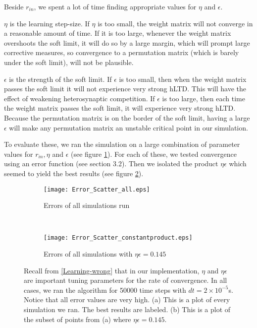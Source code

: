 Beside \(r_{in}\), we spent a lot of time finding appropriate values for \(\eta\) and \(\epsilon\). 

\(\eta\) is the learning step-size. If \(\eta\) is too small, the weight matrix will not converge in a reasonable amount of time. If it is too large, whenever the weight matrix overshoots the soft limit, it will do so by a large margin, which will prompt large corrective measures, so convergence to a permutation matrix (which is barely under the soft limit), will not be plausible.
 
\(\epsilon\) is the strength of the soft limit. If \(\epsilon\) is too small, then when the weight matrix passes the soft limit it will not experience very strong hLTD. This will have the effect of weakening heterosynaptic competition. If \(\epsilon\) is too large, then each time the weight matrix passes the soft limit, it will experience very strong hLTD. Because the permutation matrix is on the border of the soft limit, having a large \(\epsilon\) will make any permutation matrix an unstable critical point in our simulation.

To evaluate these, we ran the simulation on a large combination of parameter values for \(r_{in}, \eta\) and \(\epsilon\) (see figure \ref{Error_scatter: all}). For each of these, we tested convergence using an error function (see section 3.2). Then we isolated the product \(\eta\epsilon\) which seemed to yield the best results (see figure \ref{Error_scatter: constant product}).

\begin{figure}[H]
\centering
\begin{subfigure}[b]{0.49\textwidth}
\texttt{[image: Error\_Scatter\_all.eps]}
\caption{Errors of all simulations run}
\label{Error_scatter: all}
\end{subfigure}
\,
\begin{subfigure}[b]{0.49\textwidth}
\texttt{[image: Error\_Scatter\_constantproduct.eps]}
\caption{Errors of all simulations with \(\eta\epsilon = 0.145\)}
\label{Error_scatter: constant product}
\end{subfigure}
\label{Error_scatter}
\caption{Recall from \eqref{Learning-wrong} that in our implementation, \(\eta\) and \(\eta\epsilon\) are important tuning parameters for the rate of convergence. In all cases, we ran the algorithm for 50000 time steps with \(dt = 2\times 10^{-5}\)s. Notice that all error values are very high. (a) This is a plot of every simulation we ran. The best results are labeled. (b) This is a  plot of the subset of points from (a) where \(\eta\epsilon = 0.145\).}
\end{figure}

